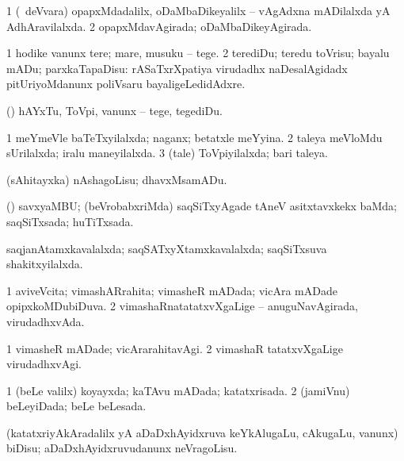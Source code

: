 \bentry
{} 
\gl{\gu}
\expl{}
\bmng
\bnum
\num{1} (\kanmu\ deVvara) opapxMdadalilx, oDaMbaDikeyalilx -- vAgAdxna mADilalxda yA AdhAravilalxda. 
\num{2} opapxMdavAgirada; oDaMbaDikeyAgirada. 
\enum
\emng
\eentry

\bentry
{} 
\gl{\sakirx}
\expl{}
\bmng
\bnum
\num{1} hodike \mo vanunx tere; mare, musuku -- tege. 
\num{2} terediDu; teredu toVrisu; bayalu mADu; parxkaTapaDisu:  rASaTxrXpatiya virudadhx naDesalAgidadx pitUriyoMdanunx poliVsaru bayaligeLedidAdxre. 
\enum
\emng

\noindent 
\gl{\akirx}
\expl{}
\bmng
(\pArxparx) hAYxTu, ToVpi, \mo vanunx -- tege, tegediDu. 
\emng
\eentry

\bentry
{} 
\gl{\gu}
\expl{}
\bmng
\bnum
\num{1} meYmeVle baTeTxyilalxda; naganx; betatxle meYyina. 
\num{2} taleya meVloMdu sUrilalxda; iralu maneyilalxda. 
\num{3} (tale) ToVpiyilalxda; bari taleya. 
\enum
\emng
\eentry

\bentry
{} 
\gl{\akirx}
\expl{}
\bmng
 (sAhitayxka) nAshagoLisu; dhavxMsamADu. 
\emng
\eentry

\bentry
{} 
\gl{\gu}
\expl{}
\bmng
 (\pArxparx) savxyaMBU; (beVrobabxriMda) saqSiTxyAgade tAneV asitxtavxkekx baMda; saqSiTxsada; huTiTxsada. 
\emng
\eentry

\bentry
{} 
\gl{\gu}
\expl{}
\bmng
 saqjanAtamxkavalalxda; saqSATxyXtamxkavalalxda; saqSiTxsuva shakitxyilalxda. 
\emng
\eentry

\bentry
{} 
\gl{\gu}
\expl{}
\bmng
\bnum
\num{1} aviveVcita; vimashARrahita; vimasheR mADada; vicAra mADade opipxkoMDubiDuva. 
\num{2} vimashaRnatatatxvXgaLige -- anuguNavAgirada, virudadhxvAda. 
\enum
\emng
\eentry

\bentry
{} 
\gl{\kirxvi}
\expl{}
\bmng
\bnum
\num{1} vimasheR mADade; vicArarahitavAgi. 
\num{2} vimashaR tatatxvXgaLige virudadhxvAgi. 
\enum
\emng
\eentry

\bentry
{} 
\gl{\gu}
\expl{}
\bmng
\bnum
\num{1} (beLe \mo valilx) koyayxda; kaTAvu mADada; katatxrisada. 
\num{2} (jamiVnu) beLeyiDada; beLe beLesada. 
\enum
\emng
\eentry

\bentry
{} 
\gl{\akirx}
\expl{}
\bmng
 (katatxriyAkAradalilx yA aDaDxhAyidxruva keYkAlugaLu, cAkugaLu, \mo vanunx) biDisu; aDaDxhAyidxruvudanunx neVragoLisu. 
\emng
\eentry

